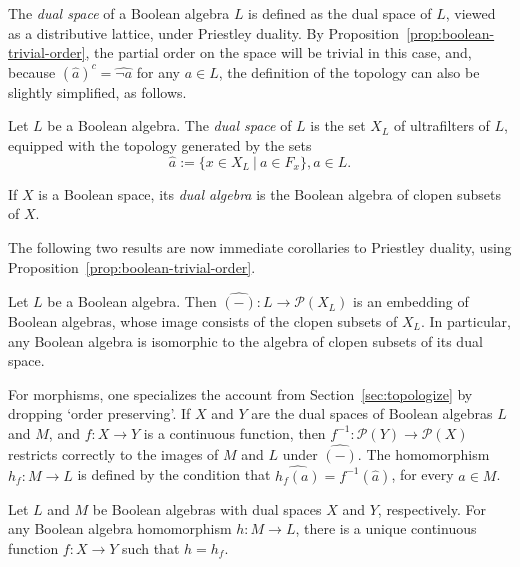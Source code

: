 The \emph{dual space} of a Boolean algebra $L$ is defined as the dual space of $L$, viewed as a distributive lattice, under Priestley duality. By Proposition~\ref{prop:boolean-trivial-order}, the partial order on the space will be trivial in this case, and, because $(\widehat{a})^c = \widehat{\neg a}$ for any $a \in L$, the definition of the topology can also be slightly simplified, as follows.
\begin{definition}
Let $L$ be a Boolean algebra. The \emph{dual space} of $L$ is the set $X_L$ of ultrafilters of $L$, equipped with the topology generated by the sets
\[ \widehat{a} := \{x \in X_L \ | \ a \in F_x\}, a \in L.\]

If $X$ is a Boolean space, its \emph{dual algebra} is the Boolean algebra of clopen subsets of $X$.
\end{definition}

The following two results are now immediate corollaries to Priestley duality, using Proposition~\ref{prop:boolean-trivial-order}.
\begin{corollary}\label{cor:doubledualBA}
Let $L$ be a Boolean algebra. Then $\widehat{(-)} \colon L \to \mathcal{P}(X_L)$ is an embedding of Boolean algebras, whose image consists of the clopen subsets of $X_L$. In particular, any Boolean algebra is isomorphic to the algebra of clopen subsets of its dual space.
\end{corollary}

For morphisms, one specializes the account from Section~\ref{sec:topologize} by dropping `order preserving'. If $X$ and $Y$ are the dual spaces of Boolean algebras $L$ and $M$, and $f \colon X \to Y$ is a continuous function, then $f^{-1} \colon \mathcal{P}(Y) \to \mathcal{P}(X)$ restricts correctly to the images of $M$ and $L$ under $\widehat{(-)}$. The homomorphism $h_f \colon M \to L$ is defined by the condition that $\widehat{h_f(a)} = f^{-1}(\widehat{a})$, for every $a \in M$.

\begin{corollary}
Let $L$ and $M$ be Boolean algebras with dual spaces $X$ and $Y$, respectively. For any Boolean algebra homomorphism $h \colon M \to L$, there is a unique continuous function $f \colon X \to Y$ such that $h = h_f$. 
\end{corollary}

